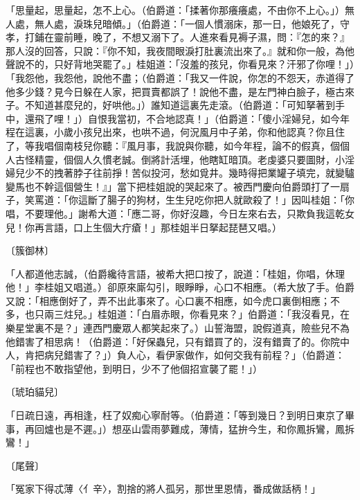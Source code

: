 \begin{showcontents}{}
「思量起，思量起，怎不上心。（伯爵道：「揉著你那癢癢處，不由你不上心。」）無人處，無人處，淚珠兒暗傾。」（伯爵道：「一個人慣溺床，那一日，他娘死了，守孝，打鋪在靈前睡，晚了，不想又溺下了。人進來看見褥子濕，問：『怎的來？』那人沒的回答，只說：『你不知，我夜間眼淚打肚裏流出來了。』就和你一般，為他聲說不的，只好背地哭罷了。」桂姐道：「沒羞的孩兒，你看見來？汗邪了你哩！」）「我怨他，我怨他，說他不盡；（伯爵道：「我又一件說，你怎的不怨天，赤道得了他多少錢？見今日躲在人家，把買賣都誤了！說他不盡，是左門神白臉子，極古來子。不知道甚麼兒的，好哄他。」）誰知道這裏先走滾。（伯爵道：「可知拏著到手中，還飛了哩！」）自恨我當初，不合地認真！」（伯爵道：「傻小淫婦兒，如今年程在這裏，小歲小孩兒出來，也哄不過，何況風月中子弟，你和他認真？你且住了，等我唱個南枝兒你聽：『風月事，我說與你聽，如今年程，論不的假真，個個人古怪精靈，個個人久慣老誠。倒將計活埋，他瞎缸暗頂。老虔婆只要圖財，小淫婦兒少不的拽著脖子往前掙！苦似投河，愁如覓井。幾時得把業罐子填完，就變驢變馬也不幹這個營生！』」當下把桂姐說的哭起來了。被西門慶向伯爵頭打了一扇子，笑罵道：「你這斷了腸子的狗材，生生兒吃你把人就歐殺了！」因叫桂姐：「你唱，不要理他。」謝希大道：「應二哥，你好沒趣，今日左來右去，只欺負我這乾女兒！你再言語，口上生個大疔瘡！」那桂姐半日拏起琵琶又唱。）

〔簇御林〕

「人都道他志誠，（伯爵纔待言語，被希大把口按了，說道：「桂姐，你唱，休理他！」李桂姐又唱道。）卻原來廝勾引，眼睜睜，心口不相應。（希大放了手。伯爵又說：「相應倒好了，弄不出此事來了。心口裏不相應，如今虎口裏倒相應；不多，也只兩三炷兒。」桂姐道：「白眉赤眼，你看見來？」伯爵道：「我沒看見，在樂星堂裏不是？」連西門慶眾人都笑起來了。）山誓海盟，說假道真，險些兒不為他錯害了相思病！（伯爵道：「好保蟲兒，只有錯買了的，沒有錯賣了的。你院中人，肯把病兒錯害了？」）負人心，看伊家做作，如何交我有前程？」（伯爵道：「前程也不敢指望他，到明日，少不了他個招宣襲了罷！」）

〔琥珀貓兒〕

「日疏日遠，再相逢，枉了奴痴心寧耐等。（伯爵道：「等到幾日？到明日東京了畢事，再回爐也是不遲。」）想巫山雲雨夢難成，薄情，猛拚今生，和你鳳拆鸞，鳳拆鸞！」

〔尾聲〕

「冤家下得忒薄〈亻辛〉，割捨的將人孤另，那世里恩情，番成做話柄！」


\end{showcontents}

